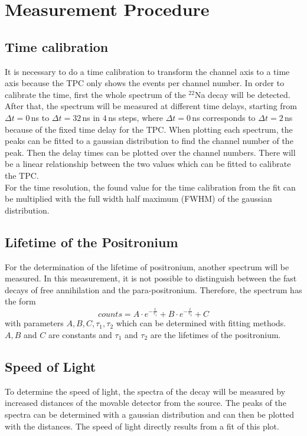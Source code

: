 \chapter{Measurement Procedure}
\section{Time calibration}
It is necessary to do a time calibration to transform the channel axis to a time axis because the TPC only shows the events per channel number. In order to calibrate the time, first the whole spectrum of the $^{22}$Na decay will be detected. After that, the spectrum will be measured at different time delays, starting from $\Delta t=0\,$ns to $\Delta t=32\,$ns in $4\,$ns steps, where $\Delta t=0\,$ns corresponds to $\Delta t=2\,$ns because of the fixed time delay for the TPC. When plotting each spectrum, the peaks can be fitted to a gaussian distribution to find the channel number of the peak. Then the delay times can be plotted over the channel numbers. There will be a linear relationship between the two values which can be fitted to calibrate the TPC. \\
For the time resolution, the found value for the time calibration from the fit can be multiplied with the full width half maximum (FWHM) of the gaussian distribution.

\section{Lifetime of the Positronium}
For the determination of the lifetime of positronium, another spectrum will be measured. In this measurement, it is not possible to distinguish between the fast decays of free annihilation and the para-positronium. Therefore, the spectrum has the form
$$counts = A \cdot e^{-\frac{t}{\tau_{1}}} + B \cdot e^{-\frac{t}{\tau_{2}}} + C $$
with parameters $A, B, C, \tau_{1}, \tau_{2}$ which can be determined with fitting methods. $A, B$ and $C$ are constants and $\tau_{1}$ and $\tau_{2}$ are the lifetimes of the positronium.

\section{Speed of Light}
To determine the speed of light, the spectra of the decay will be measured by increased distances of the movable detector from the source. The peaks of the spectra can be determined with a gaussian distribution and can then be plotted with the distances. The speed of light directly results from a fit of this plot.